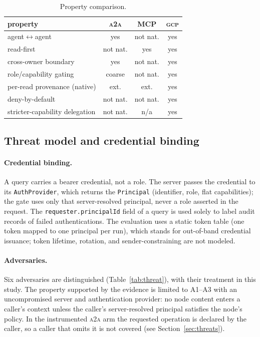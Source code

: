 \documentclass[conference,letterpaper]{IEEEtran}
\newcommand{\gcp}{\textsc{gcp}}
\newcommand{\ata}{\textsc{a2a}}
\begin{document}
\begin{table}[H]
\centering
\caption{Property comparison.}
\label{tab:props}
\setlength{\tabcolsep}{4pt}
\begin{tabular}{lccc}
\toprule
property & \ata{} & MCP & \gcp{} \\
\midrule
agent$\leftrightarrow$agent            & yes & not nat. & yes \\
read-first                             & not nat. & yes & yes \\
cross-owner boundary                   & yes & not nat. & yes \\
role/capability gating                 & coarse & not nat. & yes \\
per-read provenance (native)           & ext. & ext. & yes \\
deny-by-default                        & not nat. & not nat. & yes \\
stricter-capability delegation         & not nat. & n/a & yes \\
\bottomrule
\end{tabular}
\end{table}

\subsection{Threat model and credential binding}
\label{sec:threat-model}
\paragraph{Credential binding.} A query carries a bearer credential, not a role. The server passes
the credential to its \texttt{AuthProvider}, which returns the \texttt{Principal} (identifier, role,
flat capabilities); the gate uses only that server-resolved principal, never a role asserted in the
request. The \texttt{requester.principalId} field of a query is used solely to label audit records
of failed authentications. The evaluation uses a static token table (one token mapped to one
principal per run), which stands for out-of-band credential issuance; token lifetime, rotation, and
sender-constraining are not modeled.

\paragraph{Adversaries.} Six adversaries are distinguished (Table~\ref{tab:threat}), with their
treatment in this study. The property supported by the evidence is limited to A1--A3 with an
uncompromised server and authentication provider: no node content enters a caller's context unless the
caller's server-resolved principal satisfies the node's policy. In the instrumented \ata{} arm the
requested operation is declared by the caller, so a caller that omits it is not covered (see
Section~\ref{sec:threats}).
\end{document}
